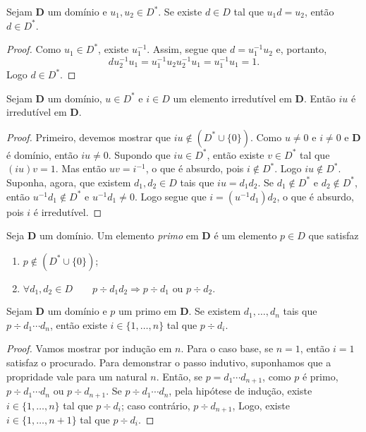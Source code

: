 \begin{prop}
	Sejam $\bm D$ um domínio e $u_1,u_2 \in D^*$. Se existe $d \in D$ tal que $u_1d=u_2$, então $d \in D^*$.
\end{prop}
\begin{proof}
	Como $u_1 \in D^*$, existe $u_1^{-1}$. Assim, segue que $d=u_1^{-1}u_2$ e, portanto,
	\begin{equation*}
	du_2^{-1}u_1=u_1^{-1}u_2u_2^{-1}u_1=u_1^{-1}u_1=1.
	\end{equation*}
Logo $d \in D^*$.
\end{proof}

\begin{prop}
	Sejam $\bm D$ um domínio, $u \in D^*$ e $i \in D$ um elemento irredutível em $\bm D$. Então $iu$ é irredutível em $\bm D$.
\end{prop}
\begin{proof}
	Primeiro, devemos mostrar que $iu \notin (D^* \cup \{0\})$. Como $u \neq 0$ e $i \neq 0$ e $\bm D$ é domínio, então $iu \neq 0$. Supondo que $iu \in D^*$, então existe $v \in D^*$ tal que $(iu)v=1$. Mas então $uv=i^{-1}$, o que é absurdo, pois $i \notin D^*$. Logo $iu \notin D^*$. Suponha, agora, que existem $d_1,d_2 \in D$ tais que $iu=d_1d_2$. Se $d_1 \notin D^*$ e $d_2 \notin D^*$, então $u^{-1}d_1 \notin D^*$ e $u^{-1}d_1 \neq 0$. Logo segue que $i=(u^{-1}d_1)d_2$, o que é absurdo, pois $i$ é irredutível.
\end{proof}

\begin{defi}
	Seja $\bm D$ um domínio. Um elemento \emph{primo} em $\bm D$ é um elemento $p \in D$ que satisfaz
	\begin{enumerate}
	\item  $p \notin (D^* \cup \{0\})$;
	\item $\forall d_1,d_2 \in D \qquad p \div d_1d_2 \Rightarrow p \div d_1 \text{\ \ ou\ \ } p \div d_2.$
	\end{enumerate}
\end{defi}

\begin{prop}
	Sejam $\bm D$ um domínio e $p$ um primo em $\bm D$. Se existem $d_1,\ldots,d_n$ tais que $p \div d_1 \cdots d_n$, então existe $i \in \{1,\ldots,n\}$ tal que $p \div d_i$.
\end{prop}
\begin{proof}
	Vamos mostrar por indução em $n$. Para o caso base, se $n=1$, então $i=1$ satisfaz o procurado. Para demonstrar o passo indutivo, suponhamos que a propridade vale para um natural $n$. Então, se $p=d_1 \cdots d_{n+1}$, como $p$ é primo, $p \div d_1 \cdots d_n$ ou $p \div d_{n+1}$. Se $p \div d_1 \cdots d_n$, pela hipótese de indução, existe $i \in \{1,\ldots,n\}$ tal que $p \div d_i$; caso contrário, $p \div d_{n+1}$, Logo, existe $i \in \{1,\ldots,n+1\}$ tal que $p \div d_i$.
\end{proof}

